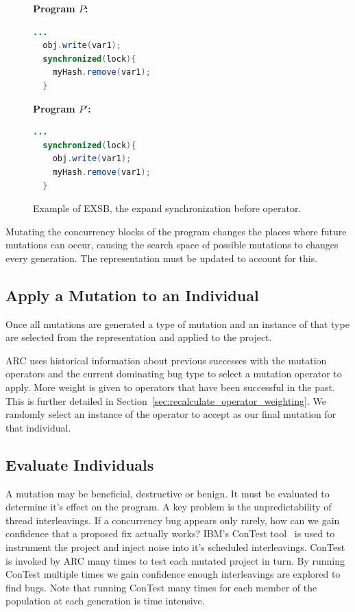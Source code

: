 \documentclass[10pt, conference, compsocconf]{IEEEtran}
\begin{document}
\begin{figure}[h!]
\vspace{2mm}
\begin{minipage}{3.70cm}

\footnotesize{\textbf{ Program $P$:}}
\begin{lstlisting}[language=Java]
  ...
  obj.write(var1);
  synchronized(lock){
    myHash.remove(var1);
  }
\end{lstlisting}
\end{minipage}\hfill
\begin{minipage}{3.70cm}
\footnotesize{\textbf{ Program $P'$:}}
\begin{lstlisting}[language=Java]
  ...
  synchronized(lock){
    obj.write(var1);
    myHash.remove(var1);
  }
\end{lstlisting}
\end{minipage}

\caption{Example of EXSB, the expand synchronization before operator.}
\label{fig:EXSB_example}
\end{figure}

Mutating the concurrency blocks of the program changes the places where future mutations can occur, causing the search space of possible mutations to changes every generation. The representation must be updated to account for this.

\subsection{Apply a Mutation to an Individual}
\label{sec:mutate_individuals}

Once all mutations are generated a type of mutation and an instance of that
type are selected from the representation and applied to the project.

ARC uses historical information about previous successes with the mutation operators and the current dominating bug type to select a mutation operator to apply. More weight is given to operators that have been successful in the past. This is further detailed in Section~\ref{sec:recalculate_operator_weighting}. We randomly select an 
instance of the operator to accept as our final mutation for that individual. 

\subsection{Evaluate Individuals}
\label{sec:evalute_individuals}

A mutation may be beneficial, destructive or benign. It must be evaluated to
determine it's effect on the program. A key problem is the unpredictability of  thread interleavings.  If a concurrency bug appears only rarely, how can we gain confidence that a proposed fix actually works?  IBM's ConTest tool~\cite{EFN+02} is used to instrument the project and inject noise into it's scheduled interleavings. ConTest is invoked by ARC many times to test each mutated project in turn. By running ConTest multiple times we gain confidence enough interleavings are explored to find bugs. Note that running ConTest many times for each member of
the population at each generation is time intensive.
\end{document}
